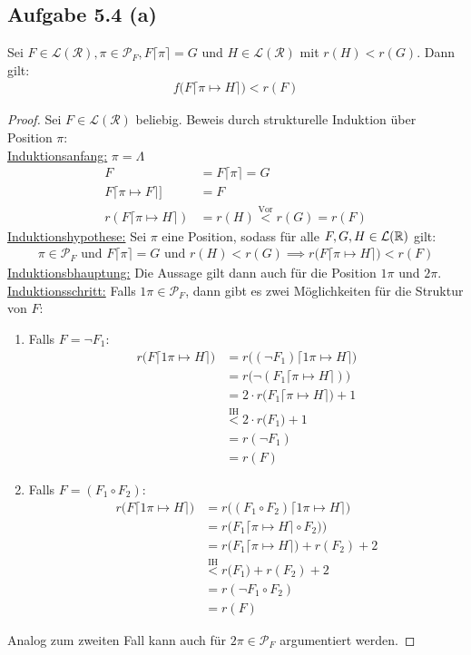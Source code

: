 \documentclass[12pt,a4paper]{article}
\newcommand{\RR}{\mathcal{R}}
\newcommand{\PP}{\mathcal{P}}
\renewcommand{\L}{\mathcal{L}}
\begin{document}
\subsection*{Aufgabe 5.4 (a)}
Sei $F\in\L(\RR),\pi\in\PP_F,F\lceil\pi\rceil=G$ und $H\in\L(\RR)$ mit $r(H)<r(G)$. Dann gilt:
\begin{align*}
f\big(F\lceil\pi\mapsto H\rceil\big)<r(F)
\end{align*}
\begin{proof}
Sei $F\in\L(\RR)$ beliebig.
Beweis durch strukturelle Induktion über Position $\pi$:\\
\ul{Induktionsanfang:} $\pi=\Lambda$
\begin{align*}
F&=F\lceil\pi\rceil=G\\
F\lceil\pi\mapsto F\rceil]&=F\\
r(F\lceil\pi\mapsto H\rceil)&=r(H)\stackrel{\text{Vor}}{<}r(G)=r(F)
\end{align*}
\ul{Induktionshypothese:} Sei $\pi$ eine Position, sodass für alle $F,G,H\in\L(\R)$ gilt:
\begin{align*}
\pi\in\PP_F\text{ und }F\lceil\pi\rceil=G\text{ und } r(H)<r(G)\implies r\big(F\lceil\pi\mapsto H\rceil\big)<r(F)
\end{align*}
\ul{Induktionsbhauptung:} Die Aussage gilt dann auch für die Position $1\pi$ und $2\pi$.\\

\ul{Induktionsschritt:} Falls $1\pi\in\PP_F$, dann gibt es zwei Möglichkeiten für die Struktur von $F$:
\begin{enumerate}
\item Falls $F=\neg F_1$:
\begin{align*}
r\big(F\lceil1\pi\mapsto H\rceil\big)
&=r\big((\neg F_1)\lceil1\pi\mapsto H\rceil\big)\\
&=r\big(\neg(F_1\lceil\pi\mapsto H\rceil)\big)\\
&=2\cdot r\big(F_1\lceil\pi\mapsto H\rceil\big)+1\\
&\stackrel{\text{IH}}{<}
2\cdot r\big(F_1\big)+1\\
&=r(\neg F_1)\\
&=r(F)
\end{align*}
\item Falls $F=(F_1\circ F_2)$:
\begin{align*}
r\big(F\lceil1\pi\mapsto H\rceil\big)
&=r\big((F_1\circ F_2)\lceil1\pi\mapsto H\rceil\big)\\
&=r\big(F_1\lceil\pi\mapsto H\rceil\circ F_2)\big)\\
&=r\big(F_1\lceil\pi\mapsto H\rceil\big)+r(F_2)+2\\
&\stackrel{\text{IH}}{<}
r\big(F_1\big)+r(F_2)+2\\
&=r(\neg F_1\circ F_2)\\
&=r(F)
\end{align*}
\end{enumerate}
Analog zum zweiten Fall kann auch für $2\pi\in\PP_F$ argumentiert werden.
\end{proof}
\end{document}
